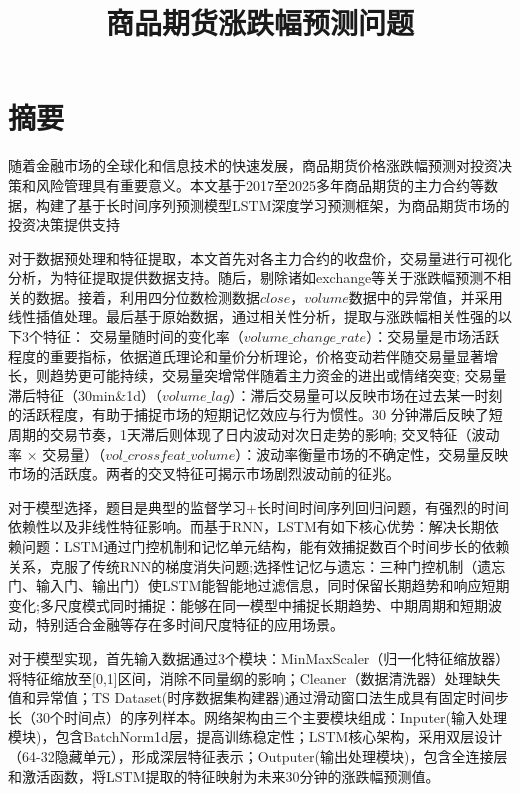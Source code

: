 \documentclass[a4paper,11pt]{ctexart}
\title{商品期货涨跌幅预测问题}
\date{}
\begin{document}
\maketitle
 

 
\section{摘要}
随着金融市场的全球化和信息技术的快速发展，商品期货价格涨跌幅预测对投资决策和风险管理具有重要意义。本文基于2017至2025多年商品期货的主力合约等数据，构建了基于长时间序列预测模型LSTM深度学习预测框架，为商品期货市场的投资决策提供支持

对于数据预处理和特征提取，本文首先对各主力合约的收盘价，交易量进行可视化分析，为特征提取提供数据支持。随后，剔除诸如exchange等关于涨跌幅预测不相关的数据。接着，利用四分位数检测数据${close}$，${volume}$数据中的异常值，并采用线性插值处理。最后基于原始数据，通过相关性分析，提取与涨跌幅相关性强的以下3个特征：
交易量随时间的变化率（${volume\_change\_rate}$）：交易量是市场活跃程度的重要指标，依据道氏理论和量价分析理论，价格变动若伴随交易量显著增长，则趋势更可能持续，交易量突增常伴随着主力资金的进出或情绪突变;
交易量滞后特征（30min\&1d）（${volume\_lag}$）：滞后交易量可以反映市场在过去某一时刻的活跃程度，有助于捕捉市场的短期记忆效应与行为惯性。30 分钟滞后反映了短周期的交易节奏，1天滞后则体现了日内波动对次日走势的影响;
交叉特征（波动率 × 交易量）（${vol\_crossfeat\_volume}$）：波动率衡量市场的不确定性，交易量反映市场的活跃度。两者的交叉特征可揭示市场剧烈波动前的征兆。

对于模型选择，题目是典型的监督学习+长时间时间序列回归问题，有强烈的时间依赖性以及非线性特征影响。而基于RNN，LSTM有如下核心优势：解决长期依赖问题：LSTM通过门控机制和记忆单元结构，能有效捕捉数百个时间步长的依赖关系，克服了传统RNN的梯度消失问题;选择性记忆与遗忘：三种门控机制（遗忘门、输入门、输出门）使LSTM能智能地过滤信息，同时保留长期趋势和响应短期变化;多尺度模式同时捕捉：能够在同一模型中捕捉长期趋势、中期周期和短期波动，特别适合金融等存在多时间尺度特征的应用场景。

对于模型实现，首先输入数据通过3个模块：MinMaxScaler（归一化特征缩放器）将特征缩放至[0,1]区间，消除不同量纲的影响；Cleaner（数据清洗器）处理缺失值和异常值；TS Dataset(时序数据集构建器)通过滑动窗口法生成具有固定时间步长（30个时间点）的序列样本。网络架构由三个主要模块组成：Inputer(输入处理模块)，包含BatchNorm1d层，提高训练稳定性；LSTM核心架构，采用双层设计（64-32隐藏单元），形成深层特征表示；Outputer(输出处理模块)，包含全连接层和激活函数，将LSTM提取的特征映射为未来30分钟的涨跌幅预测值。
\end{document}
